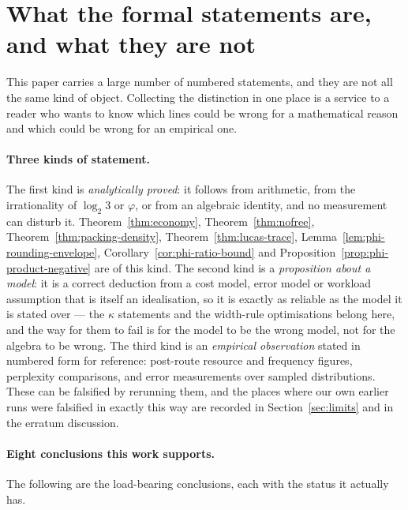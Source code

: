 \documentclass[11pt]{article}
\theoremstyle{definition}
\begin{document}
\section{What the formal statements are, and what they are
not}\label{sec:statusofstatements}

This paper carries a large number of numbered statements, and they are not all the
same kind of object. Collecting the distinction in one place is a service to a
reader who wants to know which lines could be wrong for a mathematical reason and
which could be wrong for an empirical one.

\paragraph{Three kinds of statement.} The first kind is \emph{analytically
proved}: it follows from arithmetic, from the irrationality of $\log_2 3$ or
$\varphi$, or from an algebraic identity, and no measurement can disturb it.
Theorem~\ref{thm:economy}, Theorem~\ref{thm:nofree},
Theorem~\ref{thm:packing-density}, Theorem~\ref{thm:lucas-trace},
Lemma~\ref{lem:phi-rounding-envelope}, Corollary~\ref{cor:phi-ratio-bound} and
Proposition~\ref{prop:phi-product-negative} are of this kind. The second kind is a
\emph{proposition about a model}: it is a correct deduction from a cost model,
error model or workload assumption that is itself an idealisation, so it is exactly
as reliable as the model it is stated over --- the $\kappa$ statements and the
width-rule optimisations belong here, and the way for them to fail is for the
model to be the wrong model, not for the algebra to be wrong. The third kind is an
\emph{empirical observation} stated in numbered form for reference: post-route
resource and frequency figures, perplexity comparisons, and error measurements
over sampled distributions. These can be falsified by rerunning them, and the
places where our own earlier runs were falsified in exactly this way are recorded
in Section~\ref{sec:limits} and in the erratum discussion.

\paragraph{Eight conclusions this work supports.} The following are the load-bearing
conclusions, each with the status it actually has.
\end{document}
